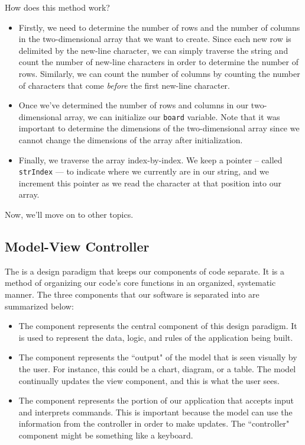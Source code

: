 How does this method work?

\begin{itemize}
    \item Firstly, we need to determine the number of rows and the number of columns in the two-dimensional array that we want to create. Since each new row is delimited by the new-line character, we can simply traverse the string and count the number of new-line characters in order to determine the number of rows. Similarly, we can count the number of columns by counting the number of characters that come \textit{before} the first new-line character.
    \item Once we've determined the number of rows and columns in our two-dimensional array, we can initialize our \verb!board! variable. Note that it was important to determine the dimensions of the two-dimensional array since we cannot change the dimensions of the array after initialization.
    \item Finally, we traverse the array index-by-index. We keep a pointer -- called \verb!strIndex! --- to indicate where we currently are in our string, and we increment this pointer as we read the character at that position into our array. 
\end{itemize}


Now, we'll move on to other topics.

\subsection{Model-View Controller}

The  is a design paradigm that keeps our components of code separate. It is a method of organizing our code's core functions in an organized, systematic manner. The three components that our software is separated into are summarized below:

\begin{itemize}
    \item The  component represents the central component of this design paradigm. It is used to represent the data, logic, and rules of the application being built.
    \item The  component represents the ``output" of the model that is seen visually by the user. For instance, this could be a chart, diagram, or a table. The model continually updates the view component, and this is what the user sees.
    \item The  component represents the portion of our application that accepts input and interprets commands. This is important because the model can use the information from the controller in order to make updates. The ``controller" component might be something like a keyboard. 
\end{itemize}

